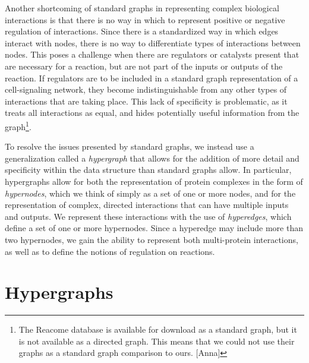 \documentclass[12pt,twoside]{reedthesis}
\newcommand{\new}[2]{{\color{purple}#1 [#2]}}
\theoremstyle{definition}
\begin{document}
Another shortcoming of standard graphs in representing complex biological interactions is that there is no way in which to represent positive or negative regulation of interactions.  Since there is a standardized way in which edges interact with nodes, there is no way to differentiate types of interactions between nodes.  This poses a challenge when there are regulators or catalysts present that are necessary for a reaction, but are not part of the inputs or outputs of the reaction.  If regulators are to be included in a standard graph representation of a cell-signaling network, they become indistinguishable from any other types of interactions that are taking place.  This lack of specificity is problematic, as it treats all interactions as equal, and hides potentially useful information from the graph\footnote{\new{The Reacome database is available for download as a standard graph, but it is not available as a directed graph. This means that we could not use their graphs as a standard graph comparison to ours.}{Anna}}.\par

To resolve the issues presented by standard graphs, we instead use a generalization called a \textit{hypergraph} that allows for the addition of more detail  and specificity within the data structure than standard graphs allow.  In particular, hypergraphs allow for both the representation of protein complexes in the form of \textit{hypernodes}, which we think of simply as a set of one or more nodes, and for the representation of complex, directed interactions that can have multiple inputs and outputs.  We represent these interactions with the use of \textit{hyperedges}, which define a set of one or more hypernodes.  Since a hyperedge may include more than two hypernodes, we gain the ability to represent both multi-protein interactions, as well as to define the notions of regulation on reactions.\par

\section{Hypergraphs}
\end{document}
